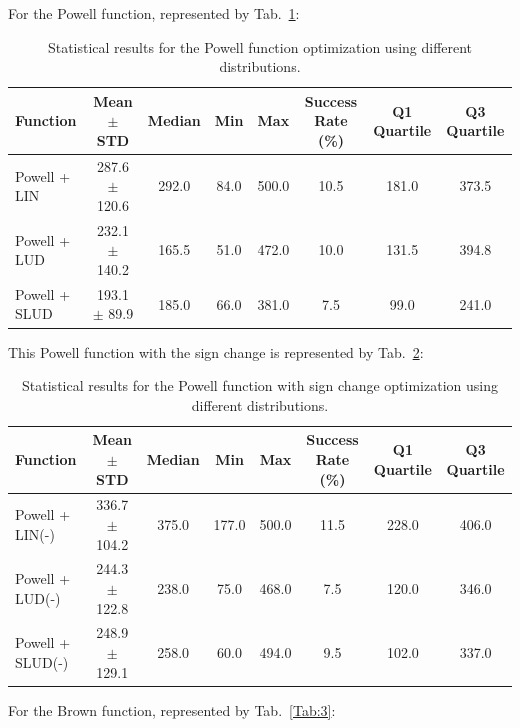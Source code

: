 \documentclass[10pt,fleqn,a4paper,twoside]{article}
\begin{document}
For the Powell function, represented by Tab.~\ref{Tab:2}:

\begin{table}[H]
\centering
\caption{Statistical results for the Powell function optimization using different distributions.}
\label{Tab:2}
\begin{tabular}{l|c|c|c|c|c|c|c}
\hline
\textbf{Function} & \textbf{Mean $\pm$ STD} & \textbf{Median} & \textbf{Min} & \textbf{Max} & \textbf{Success Rate (\%)} & \textbf{Q1 Quartile} & \textbf{Q3 Quartile}\\
\hline
Powell + LIN         & 287.6 $\pm$ 120.6     & 292.0 & 84.0 & 500.0 & 10.5 & 181.0 & 373.5\\
Powell + LUD         & 232.1 $\pm$ 140.2     & 165.5 & 51.0 & 472.0 & 10.0 & 131.5 & 394.8\\
Powell + SLUD        & 193.1 $\pm$ 89.9      & 185.0 & 66.0 & 381.0 & 7.5 & 99.0 & 241.0\\
\hline
\end{tabular}
\end{table}

This Powell function with the sign change is represented by Tab.~\ref{Tab:2b}:

\begin{table}[H]
\centering
\caption{Statistical results for the Powell function with sign change optimization using different distributions.}
\label{Tab:2b}
\begin{tabular}{l|c|c|c|c|c|c|c}
\hline
\textbf{Function} & \textbf{Mean $\pm$ STD} & \textbf{Median} & \textbf{Min} & \textbf{Max} & \textbf{Success Rate (\%)} & \textbf{Q1 Quartile} & \textbf{Q3 Quartile}\\
\hline
Powell + LIN(-)         & 336.7 $\pm$ 104.2     & 375.0 & 177.0 & 500.0 & 11.5 & 228.0 & 406.0\\
Powell + LUD(-)         & 244.3 $\pm$ 122.8     & 238.0 & 75.0 & 468.0 & 7.5 & 120.0 & 346.0\\
Powell + SLUD(-)        & 248.9 $\pm$ 129.1     & 258.0 & 60.0 & 494.0 & 9.5 & 102.0 & 337.0\\
\hline
\end{tabular}
\end{table}

For the Brown function, represented by Tab.~\ref{Tab:3}:
\end{document}
